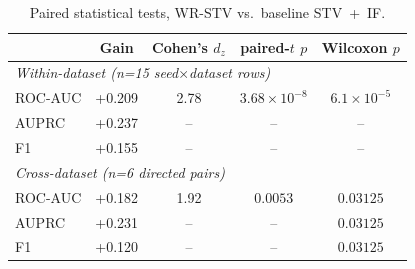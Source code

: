 \begin{table}[t]
\centering
\caption{Paired statistical tests, WR-STV vs.\ baseline STV~+~IF.}
\label{tab:main-stats}
\begin{tabular}{lcccc}
\toprule
& \textbf{Gain} & \textbf{Cohen's $d_z$} & \textbf{paired-$t$ $p$} & \textbf{Wilcoxon $p$} \\
\midrule
\multicolumn{5}{l}{\textit{Within-dataset (n=15 seed$\times$dataset rows)}} \\
ROC-AUC & +0.209 & 2.78 & $3.68 \times 10^{-8}$ & $6.1 \times 10^{-5}$ \\
AUPRC   & +0.237 & --   & --                     & -- \\
F1      & +0.155 & --   & --                     & -- \\
\midrule
\multicolumn{5}{l}{\textit{Cross-dataset (n=6 directed pairs)}} \\
ROC-AUC & +0.182 & 1.92 & $0.0053$ & $0.03125$ \\
AUPRC   & +0.231 & --   & --       & $0.03125$ \\
F1      & +0.120 & --   & --       & $0.03125$ \\
\bottomrule
\end{tabular}
\end{table}
